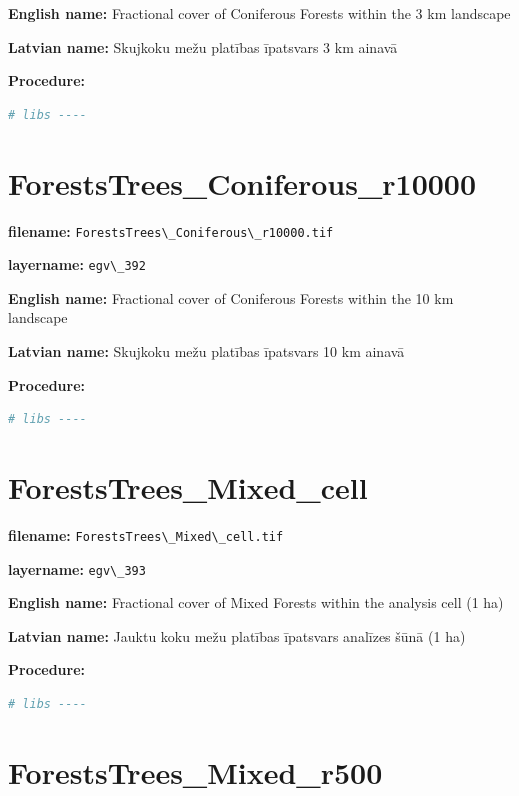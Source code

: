 \documentclass[
]{book}
\newcommand{\passthrough}[1]{#1}
\begin{document}
\textbf{English name:} Fractional cover of Coniferous Forests within the 3 km landscape

\textbf{Latvian name:} Skujkoku mežu platības īpatsvars 3 km ainavā

\textbf{Procedure:}

\begin{lstlisting}[language=R]
# libs ----
\end{lstlisting}

\section{ForestsTrees\_Coniferous\_r10000}\label{ch06.392}

\textbf{filename:} \passthrough{\lstinline!ForestsTrees\_Coniferous\_r10000.tif!}

\textbf{layername:} \passthrough{\lstinline!egv\_392!}

\textbf{English name:} Fractional cover of Coniferous Forests within the 10 km landscape

\textbf{Latvian name:} Skujkoku mežu platības īpatsvars 10 km ainavā

\textbf{Procedure:}

\begin{lstlisting}[language=R]
# libs ----
\end{lstlisting}

\section{ForestsTrees\_Mixed\_cell}\label{ch06.393}

\textbf{filename:} \passthrough{\lstinline!ForestsTrees\_Mixed\_cell.tif!}

\textbf{layername:} \passthrough{\lstinline!egv\_393!}

\textbf{English name:} Fractional cover of Mixed Forests within the analysis cell (1 ha)

\textbf{Latvian name:} Jauktu koku mežu platības īpatsvars analīzes šūnā (1 ha)

\textbf{Procedure:}

\begin{lstlisting}[language=R]
# libs ----
\end{lstlisting}

\section{ForestsTrees\_Mixed\_r500}\label{ch06.394}
\end{document}
